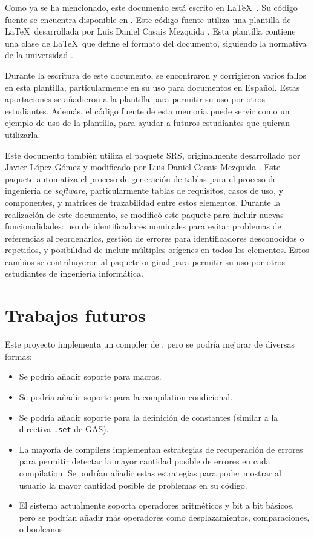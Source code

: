 Como ya se ha mencionado, este documento está escrito en
\LaTeX~\parencite{latex}. Su código fuente se encuentra disponible en
\myreportrepo. Este código fuente utiliza una plantilla de \LaTeX~desarrollada
por Luis Daniel Casais Mezquida \parencite{UC3Mtemplate}. Esta plantilla
contiene una clase de \LaTeX~que define el formato del documento, siguiendo la
normativa de la universidad \parencite{report-guidelines}.

Durante la escritura de este documento, se encontraron y corrigieron varios
fallos en esta plantilla, particularmente en su uso para documentos en Español.
Estas aportaciones se añadieron a la plantilla para permitir su uso por otros
estudiantes. Además, el código fuente de esta memoria puede servir como un
ejemplo de uso de la plantilla, para ayudar a futuros estudiantes que quieran
utilizarla.

Este documento también utiliza el paquete SRS, originalmente desarrollado por
Javier López Gómez y modificado por Luis Daniel Casais Mezquida
\parencite{srs-package}. Este paquete automatiza el proceso de generación de
tablas para el proceso de ingeniería de \textit{software}, particularmente
tablas de requisitos, casos de uso, y componentes, y matrices de trazabilidad
entre estos elementos. Durante la realización de este documento, se modificó
este paquete para incluir nuevas funcionalidades: uso de identificadores
nominales para evitar problemas de referencias al reordenarlos, gestión de
errores para identificadores desconocidos o repetidos, y posibilidad de incluir
múltiples orígenes en todos los elementos. Estos cambios se contribuyeron al
paquete original para permitir su uso por otros estudiantes de ingeniería
informática.

\section{Trabajos futuros}\label{sec:future-work}

Este proyecto implementa un \gls{compiler} de ,
pero se podría mejorar de diversas formas:

\begin{itemize}
    \item Se podría añadir soporte para \glspl{macro}.
    \item Se podría añadir soporte para la \gls{compilation} condicional.
    \item Se podría añadir soporte para la definición de constantes (similar a
    la directiva \verb!.set! de \gls{GAS}).
    \item La mayoría de \glspl{compiler} implementan estrategias de recuperación
    de errores para permitir detectar la mayor cantidad posible de errores en
    cada \gls{compilation}. Se podrían añadir estas estrategias para poder
    mostrar al usuario la mayor cantidad posible de problemas en su código.
    \item El sistema actualmente soporta operadores aritméticos y bit a bit
    básicos, pero se podrían añadir más operadores como desplazamientos,
    comparaciones, o booleanos.
\end{itemize}

